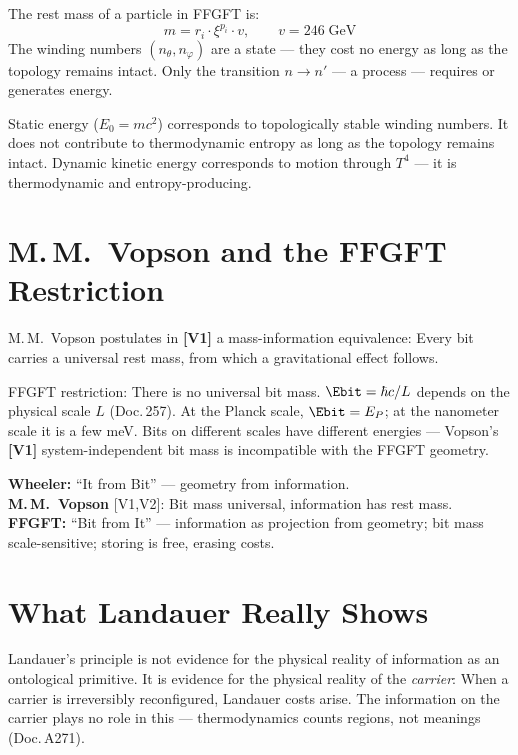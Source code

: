 The rest mass of a particle in FFGFT is:
\[
  m = r_i \cdot \xi^{p_i} \cdot v, \qquad v = 246\;\text{GeV}
\]
The winding numbers $(n_\theta, n_\varphi)$ are a state --- they cost
no energy as long as the topology remains intact. Only the transition
$n \to n'$ --- a process --- requires or generates energy.

Static energy ($E_0 = mc^2$) corresponds to topologically stable
winding numbers. It does not contribute to thermodynamic entropy
as long as the topology remains intact. Dynamic kinetic energy
corresponds to motion through $T^4$ --- it is thermodynamic and
entropy-producing.

\section{M.\,M.~Vopson and the FFGFT Restriction}

M.\,M.~Vopson postulates in \textbf{[V1]} a mass-information equivalence: Every bit
carries a universal rest mass, from which a gravitational effect follows.

FFGFT restriction: There is no universal bit mass.
$\Ebit = \hbar c / L$ depends on the physical scale $L$ (Doc.\,257).
At the Planck scale, $\Ebit = E_P$; at the nanometer scale it is
a few meV. Bits on different scales have different energies ---
Vopson's \textbf{[V1]} system-independent bit mass is incompatible with the FFGFT geometry.

\begin{ffgftbox}
\textbf{Wheeler:} \enquote{It from Bit} --- geometry from information.\\
\textbf{M.\,M.~Vopson} {[V1,V2]}: Bit mass universal, information has rest mass.\\
\textbf{FFGFT:} \enquote{Bit from It} --- information as projection from
geometry; bit mass scale-sensitive; storing is free, erasing costs.
\end{ffgftbox}

\section{What Landauer Really Shows}

Landauer's principle is not evidence for the physical reality of
information as an ontological primitive. It is evidence for the physical
reality of the \emph{carrier}: When a carrier is irreversibly reconfigured,
Landauer costs arise. The information on the carrier plays no
role in this --- thermodynamics counts regions, not meanings (Doc.\,A271).